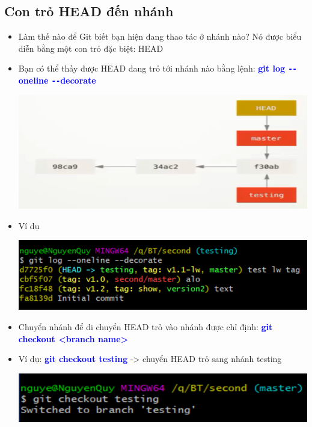 \documentclass[12pt,a4paper]{report}
\begin{document}
\subsection{Con trỏ HEAD đến nhánh}
\begin{itemize}
\item Làm thế nào để Git biết bạn hiện đang thao tác ở nhánh nào? Nó được biểu diễn bằng một con trỏ đặc biệt: HEAD
\item Bạn có thể thấy được HEAD đang trỏ tới nhánh nào bằng lệnh: \textcolor{blue}{\bf git log \texttt{-{}-}oneline \texttt{-{}-}decorate}

	\includegraphics[width=0.8\linewidth]{screenshot052}
	
	\label{fig:screenshot052}

\item Ví dụ

	\includegraphics[width=0.8\linewidth]{screenshot053}
	
	\label{fig:screenshot053}

\item Chuyển nhánh để di chuyển HEAD trỏ vào nhánh được chỉ định: \textcolor{blue}{\bf git checkout <branch name>} 
\item Ví dụ: \textcolor{blue}{\bf git checkout testing} -> chuyển HEAD trỏ sang nhánh testing

	\includegraphics[width=0.8\linewidth]{screenshot054}

	\label{fig:screenshot054}

\end{itemize}
\end{document}
